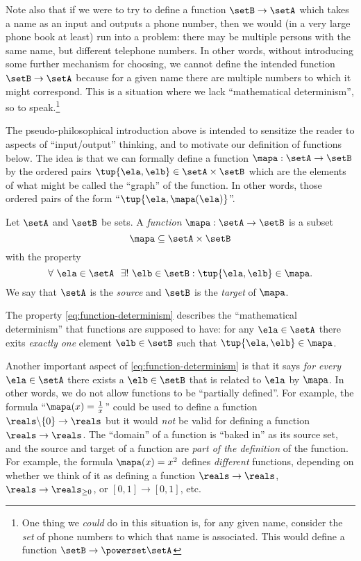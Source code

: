 Note also that if we were to try to define a function $\setB \to \setA$ which takes a name as an input and outputs a phone number, then we would (in a very large phone book at least) run into a problem: there may be multiple persons with the same name, but different telephone numbers. In other words, without introducing some further mechanism for choosing, we cannot define the intended function $\setB \to \setA$ because for a given name there are multiple numbers to which it might correspond. This is a situation where we lack ``mathematical determinism'', so to speak.\footnote{One thing we \emph{could} do in this situation is, for any given name, consider the \emph{set} of phone numbers to which that name is associated. This would define a function $\setB \to \powerset \setA$}

The pseudo-philosophical introduction above is intended to sensitize the reader to aspects of ``input/output'' thinking, and to motivate our definition of functions below. The idea is that we can formally define a function $\mapa: \setA \to \setB$ by the ordered pairs $\tup{\ela, \elb} \in \setA \times \setB$ which are the elements of what might be called the ``graph'' of the function. In other words, those ordered pairs of the form ``$\tup{\ela, \mapa(\ela)}$''.

\begin{definition}
Let $\setA$ and $\setB$ be sets. A \emph{function} $\mapa: \setA \to \setB$ is a subset
\begin{equation}
\mapa \subseteq \setA \times \setB
\end{equation}
with the property 
\begin{equation}\label{eq:function-determinism}
\forall \ \ela \in \setA  \ \  \exists ! \ \elb \in \setB : \tup{\ela,\elb} \in \mapa.
\end{equation}
We say that $\setA$ is the \emph{source} and $\setB$ is the \emph{target} of $\mapa$. 
\end{definition}

The property \cref{eq:function-determinism} describes the ``mathematical determinism'' that functions are supposed to have: for any $\ela \in \setA$ there exits \emph{exactly one} element $\elb \in \setB$ such that $\tup{\ela, \elb} \in \mapa$. 

Another important aspect of \cref{eq:function-determinism} is that it says \emph{for every} $\ela \in \setA$ there exists a $\elb \in \setB$ that is related to $\ela$ by $\mapa$. In other words, we do not allow functions to be ``partially defined''. For example, the formula ``$\mapa(x) = \frac{1}{x}$'' could be used to define a function $\reals \backslash \{ 0 \} \to \reals$ but it would \emph{not} be valid for defining a function $\reals \to \reals$. The ``domain'' of a function is ``baked in'' as its source set, and the source and target of a function are \emph{part of the definition} of the function. For example, the formula $\mapa(x) = x^2$ defines \emph{different} functions, depending on whether we think of it as defining a function $\reals \to \reals$, $\reals \to \reals_{\geq 0}$, or $[0,1] \to [0,1]$, etc. 

\clearpage
